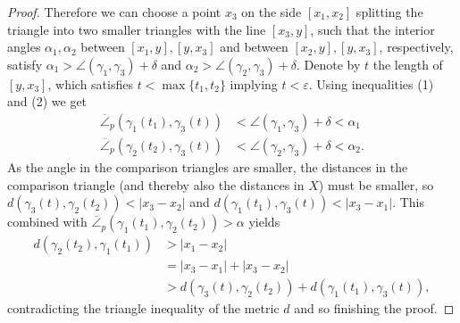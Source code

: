 \documentclass[11pt, a4paper, oneside]{memoir}
\theoremstyle{plain}\newtheorem{theorem}[subsection]{Theorem}
\theoremstyle{definition}
\begin{document}
\begin{proof}
Therefore we can choose a point \(x_3\) on the side \([x_1,x_2]\) splitting the triangle into two smaller triangles with the line \([x_3,y]\), such that the interior angles \(\alpha_1,\alpha_2\) between \([x_1,y],[y,x_3]\) and between \([x_2,y],[y,x_3]\), respectively, satisfy \(\alpha_1>\angle(\gamma_1,\gamma_3)+\delta\) and \(\alpha_2>\angle(\gamma_2,\gamma_3)+\delta\).
Denote by \(t\) the length of \([y,x_3]\), which satisfies \(t<\max\{t_1,t_2\}\) implying \(t<\varepsilon\).
Using inequalities (1) and (2) we get 
\begin{align*}
\overline{\angle}_p(\gamma_1(t_1),\gamma_3(t))    &<\angle(\gamma_1,\gamma_3)+\delta<\alpha_1\\
\overline{\angle}_p(\gamma_2(t_2),\gamma_3(t))   &<\angle(\gamma_2,\gamma_3)+\delta<\alpha_2.
\end{align*}
As the angle in the comparison triangles are smaller, the distances in the comparison triangle (and thereby also the distances in \(X\)) must be smaller, so \(d(\gamma_3(t),\gamma_2(t_2))<|x_3-x_2|\) and \(d(\gamma_1(t_1),\gamma_3(t))<|x_3-x_1|\).
This combined with \(\overline{\angle}_p(\gamma_1(t_1),\gamma_2(t_2))>\alpha\) yields
\begin{align*}
d(\gamma_2(t_2),\gamma_1(t_1))  &>|x_1-x_2|\\
                    &=|x_3-x_1|+|x_3-x_2|\\
                    &>d(\gamma_3(t),\gamma_2(t_2))+d(\gamma_1(t_1),\gamma_3(t)),
\end{align*}
contradicting the triangle inequality of the metric \(d\) and so finishing the proof.
\end{proof}
\end{document}
